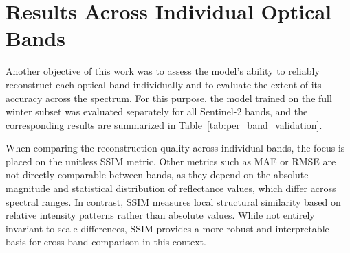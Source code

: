 \section{Results Across Individual Optical Bands}
Another objective of this work was to assess the model’s ability to reliably reconstruct each optical band individually and to evaluate the extent of its accuracy across the spectrum. 
For this purpose, the model trained on the full winter subset was evaluated separately for all Sentinel-2 bands, and the corresponding results are summarized in Table~\ref{tab:per_band_validation}.

When comparing the reconstruction quality across individual bands, the focus is placed on the unitless SSIM metric. Other metrics such as MAE or RMSE are not directly comparable between bands, as they depend on the absolute magnitude and statistical distribution of reflectance values, which differ across spectral ranges. In contrast, SSIM measures local structural similarity based on relative intensity patterns rather than absolute values. While not entirely invariant to scale differences, SSIM provides a more robust and interpretable basis for cross-band comparison in this context.

\begin{table}[h!]
\centering
\caption[Per-band validation results for full dataset training]{%
Per-band quantitative validation results of the \textit{pix2pix} model trained on the full winter subset. Each Sentinel-2 band’s central wavelength, spectral designation, and native spatial resolution are listed for reference.}
\label{tab:per_band_validation}
\end{table}

